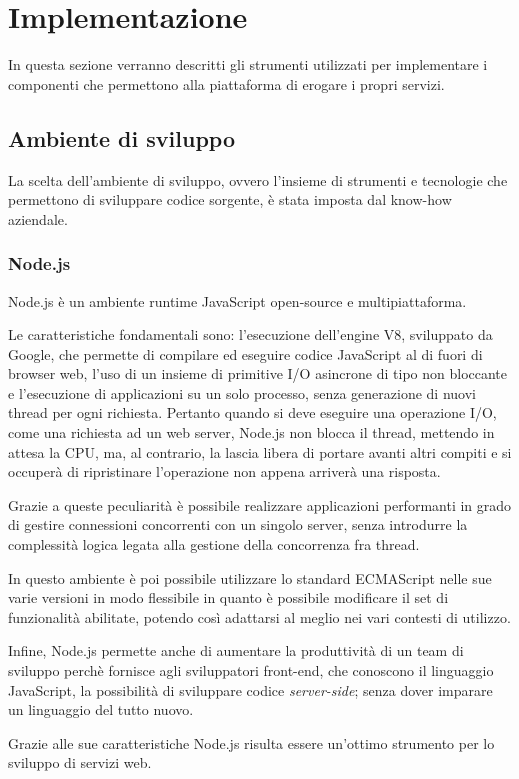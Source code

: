 \section{Implementazione}

\par
In questa sezione verranno descritti gli strumenti utilizzati per implementare i componenti che
permettono alla piattaforma di erogare i propri servizi.

\subsection{Ambiente di sviluppo}

\par
La scelta dell'ambiente di sviluppo, ovvero l'insieme di strumenti e tecnologie che permettono di sviluppare codice sorgente, è stata imposta dal know-how aziendale.
\subsubsection{Node.js}

\par
Node.js è un ambiente runtime JavaScript open-source e multipiattaforma.
\par
Le caratteristiche fondamentali sono: l'esecuzione dell'engine V8, sviluppato da Google, che permette di compilare ed eseguire codice JavaScript al di fuori di browser web,
l'uso di un insieme di primitive I/O asincrone di tipo non bloccante e l'esecuzione di applicazioni su un solo processo, senza generazione di nuovi thread per ogni richiesta.
Pertanto quando si deve eseguire una operazione I/O, come una richiesta ad un web server, Node.js non blocca il thread, mettendo in attesa la CPU, ma, al contrario,
la lascia libera di portare avanti altri compiti e si occuperà di ripristinare l'operazione non appena arriverà una risposta.
\par
Grazie a queste peculiarità è possibile realizzare applicazioni performanti in grado di gestire connessioni concorrenti con un singolo server, senza introdurre la complessità
logica legata alla gestione della concorrenza fra thread.
\par
In questo ambiente è poi possibile utilizzare lo standard ECMAScript nelle sue varie versioni in modo flessibile in quanto è possibile modificare il set di funzionalità abilitate,
potendo così adattarsi al meglio nei vari contesti di utilizzo.
\par
Infine, Node.js permette anche di aumentare la produttività di un team di sviluppo perchè fornisce agli sviluppatori front-end,
che conoscono il linguaggio JavaScript, la possibilità di sviluppare codice \textit{server-side}; senza dover imparare un linguaggio del tutto nuovo.
\par
Grazie alle sue caratteristiche Node.js risulta essere un'ottimo strumento per lo sviluppo di servizi web.

